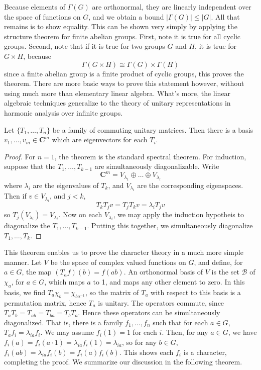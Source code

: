 Because elements of $\Gamma(G)$ are orthonormal, they are linearly independent over the space of functions on $G$, and we obtain a bound $|\Gamma(G)| \leq |G|$. All that remains is to show equality. This can be shown very simply by applying the structure theorem for finite abelian groups. First, note it is true for all cyclic groups. Second, note that if it is true for two groups $G$ and $H$, it is true for $G \times H$, because
%
\[ \Gamma(G \times H) \cong \Gamma(G) \times \Gamma(H) \]
%
since a finite abelian group is a finite product of cyclic groups, this proves the theorem. There are more basic ways to prove this statement however, without using much more than elementary linear algebra. What's more, the linear algebraic techniques generalize to the theory of unitary representations in harmonic analysis over infinite groups.

\begin{theorem}
    Let $\{ T_1, \dots, T_n \}$ be a family of commuting unitary matrices. Then there is a basis $v_1, \dots, v_m \in \mathbf{C}^m$ which are eigenvectors for each $T_i$.
\end{theorem}
\begin{proof}
    For $n = 1$, the theorem is the standard spectral theorem. For induction, suppose that the $T_1, \dots, T_{k-1}$ are simultaneously diagonalizable. Write
    \[ \mathbf{C}^m = V_{\lambda_1} \oplus \dots \oplus V_{\lambda_l} \]
    where $\lambda_i$ are the eigenvalues of $T_k$, and $V_{\lambda_i}$ are the corresponding eigenspaces. Then if $v \in V_{\lambda_i}$, and $j < k$,
    \[ T_k T_j v = T_j T_k v = \lambda_i T_j v \]
    so $T_j(V_{\lambda_i}) = V_{\lambda_i}$. Now on each $V_{\lambda_i}$, we may apply the induction hypotheis to diagonalize the $T_1, \dots, T_{k-1}$. Putting this together, we simultaneously diagonalize $T_1, \dots, T_k$.
\end{proof}

This theorem enables us to prove the character theory in a much more simple manner. Let $V$ be the space of complex valued functions on $G$, and define, for $a \in G$, the map $(T_a f)(b) = f(ab)$. An orthonormal basis of $V$ is the set $\mathcal{B}$ of $\chi_a$, for $a \in G$, which maps $a$ to 1, and maps any other element to zero. In this basis, we  find $T_a \chi_b = \chi_{ba^{-1}}$, so the matrix of $T_a$ with respect to this basis is a permutation matrix, hence $T_a$ is unitary. The operators commute, since $T_a T_b = T_{ab} = T_{ba} = T_b T_a$. Hence these operators can be simultaneously diagonalized. That is, there is a family $f_1, \dots, f_n$ such that for each $a \in G$, $T_a f_i = \lambda_{ia} f_i$. We may assume $f_i(1) = 1$ for each $i$. Then, for any $a \in G$, we have $f_i(a) = f_i(a \cdot 1) = \lambda_{ia} f_i(1) = \lambda_{ia}$, so for any $b \in G$, $f_i(ab) = \lambda_{ia} f_i(b) = f_i(a) f_i(b)$. This shows each $f_i$ is a character, completing the proof. We summarize our discussion in the following theorem.

